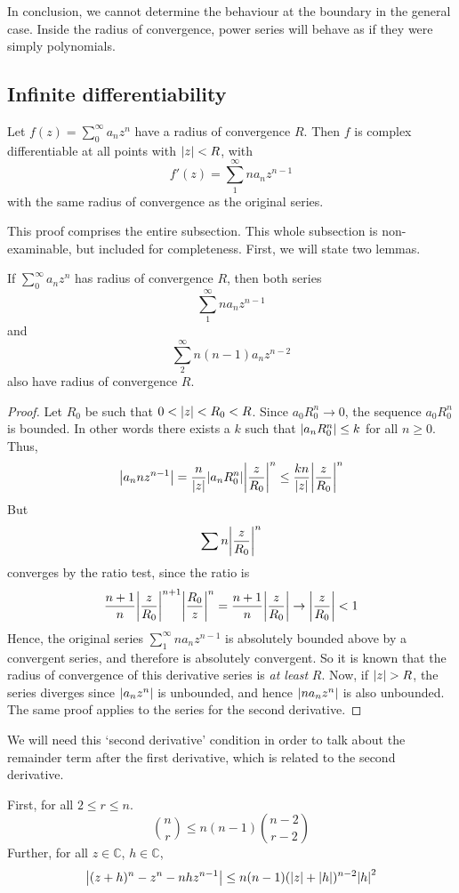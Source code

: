 \noindent In conclusion, we cannot determine the behaviour at the boundary in the general case.
Inside the radius of convergence, power series will behave as if they were simply polynomials.

\subsection{Infinite differentiability}
\begin{theorem}
	Let \(f(z) = \sum_0^\infty a_n z^n\) have a radius of convergence \(R\).
	Then \(f\) is complex differentiable at all points with \(\abs{z} < R\), with
	\[
		f'(z) = \sum_1^\infty n a_n z^{n-1}
	\]
	with the same radius of convergence as the original series.
\end{theorem}
\noindent This proof comprises the entire subsection.
This whole subsection is non-examinable, but included for completeness.
First, we will state two lemmas.
\begin{lemma}
	If \(\sum_0^\infty a_n z^n\) has radius of convergence \(R\), then both series
	\[
		\sum_1^\infty n a_n z^{n-1}
	\]
	and
	\[
		\sum_2^\infty n(n-1)a_n z^{n-2}
	\]
	also have radius of convergence \(R\).
\end{lemma}
\begin{proof}
	Let \(R_0\) be such that \(0 < \abs{z} < R_0 < R\).
	Since \(a_0 R_0^n \to 0\), the sequence \(a_0 R_0^n\) is bounded.
	In other words there exists a \(k\) such that \(\abs{a_n R_0^n} \leq k\) for all \(n \geq 0\).
	Thus,
	\[
		\abs{a_n n z^{n-1}} = \frac{n}{\abs{z}}\abs{a_n R_0^n} \abs{\frac{z}{R_0}}^n \leq \frac{kn}{\abs{z}}\abs{\frac{z}{R_0}}^n
	\]
	But
	\[
		\sum n\abs{\frac{z}{R_0}}^n
	\]
	converges by the ratio test, since the ratio is
	\[
		\frac{n+1}{n}\abs{\frac{z}{R_0}}^{n+1} \abs{\frac{R_0}{z}}^n = \frac{n+1}{n}\abs{\frac{z}{R_0}} \to \abs{\frac{z}{R_0}} < 1
	\]
	Hence, the original series \(\sum_1^\infty n a_n z^{n-1}\) is absolutely bounded above by a convergent series, and therefore is absolutely convergent.
	So it is known that the radius of convergence of this derivative series is \textit{at least} \(R\).
	Now, if \(\abs{z} > R\), the series diverges since \(\abs{a_n z^n}\) is unbounded, and hence \(\abs{n a_n z^n}\) is also unbounded.
	The same proof applies to the series for the second derivative.
\end{proof}
\noindent We will need this `second derivative' condition in order to talk about the remainder term after the first derivative, which is related to the second derivative.
\begin{lemma}
	First, for all \(2 \leq r \leq n\).
	\[
		\binom{n}{r} \leq n(n-1)\binom{n-2}{r-2}
	\]
	Further, for all \(z \in \mathbb C\), \(h \in \mathbb C\),
	\[
		\abs{(z + h)^n - z^n - nhz^{n-1}} \leq n(n-1)(\abs{z} + \abs{h})^{n-2}\abs{h}^2
	\]
\end{lemma}
